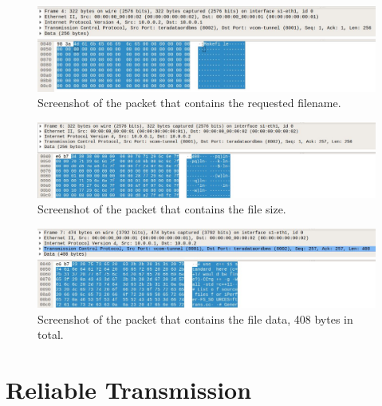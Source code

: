 \documentclass[a4paper]{article}
\begin{document}
\begin{figure}[htbp]
\centering
\includegraphics[scale=0.85]{13.jpg}
\caption{Screenshot of the packet that contains the requested filename.}
\end{figure}

\begin{figure}[htbp]
\centering
\includegraphics[scale=0.8]{14.jpg}
\caption{Screenshot of the packet that contains the file size.}
\end{figure}

\begin{figure}[htbp]
\centering
\includegraphics[scale=0.82]{15.jpg}
\caption{Screenshot of the packet that contains the file data, 408 bytes in total.}
\end{figure}
\section{Reliable Transmission}
\end{document}
